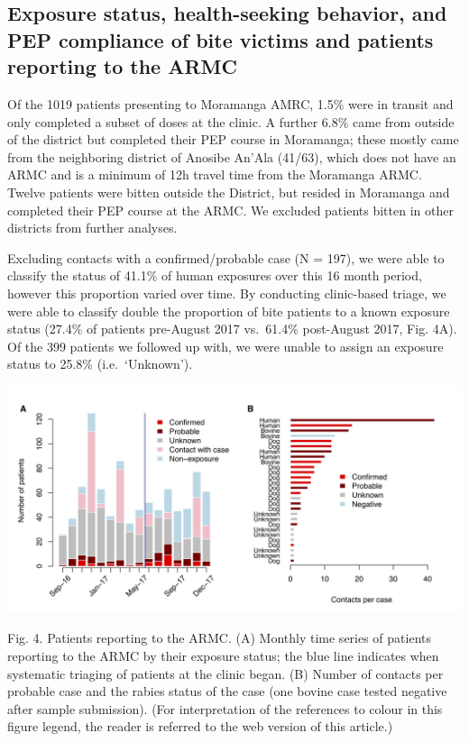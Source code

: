 \documentclass[
]{book}
\begin{document}
\hypertarget{exposure-status-health-seeking-behavior-and-pep-compliance-of-bite-victims-and-patients-reporting-to-the-armc}{%
\subsection{Exposure status, health-seeking behavior, and PEP compliance of bite victims and patients reporting to the ARMC}\label{exposure-status-health-seeking-behavior-and-pep-compliance-of-bite-victims-and-patients-reporting-to-the-armc}}

Of the 1019 patients presenting to Moramanga AMRC, 1.5\% were in transit and only completed a subset of doses at the clinic. A further 6.8\% came from outside of the district but completed their PEP course in Moramanga; these mostly came from the neighboring district of Anosibe An'Ala (41/63), which does not have an ARMC and is a minimum of 12h travel time from the Moramanga ARMC. Twelve patients were bitten outside the District, but resided in Moramanga and completed their PEP course at the ARMC. We excluded patients bitten in other districts from further analyses.

Excluding contacts with a confirmed/probable case (N = 197), we were able to classify the status of 41.1\% of human exposures over this 16 month period, however this proportion varied over time. By conducting clinic-based triage, we were able to classify double the proportion of bite patients to a known exposure status (27.4\% of patients pre-August 2017 vs.~61.4\% post-August 2017, Fig. 4A). Of the 399 patients we followed up with, we were unable to assign an exposure status to 25.8\% (i.e.~`Unknown').

\includegraphics[width=0.95\linewidth]{figs/ch1/fig4}

Fig. 4. Patients reporting to the ARMC. (A) Monthly time series of patients reporting to the ARMC by their exposure status; the blue line indicates when systematic triaging of patients at the clinic began. (B) Number of contacts per probable case and the rabies status of the case (one bovine case tested negative after sample submission). (For interpretation of the references to colour in this figure legend, the reader is referred to the web version of this article.)
\end{document}

